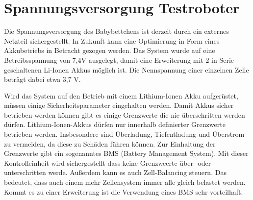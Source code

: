 



\section[Spannungsversorgung Testroboter]{Spannungsversorgung Testroboter\authorkatrin} \label{Spannungsversorgung Optimierung}
Die Spannungsversorgung des Babybettchens ist derzeit durch ein externes Netzteil sichergestellt. In Zukunft kann eine Optimierung in Form eines Akkubetriebs in Betracht gezogen werden.
Das System wurde auf eine Betreibsspannung von 7,4V ausgelegt, damit eine Erweiterung mit 2 in Serie geschaltenen Li-Ionen Akkus möglich ist. Die Nennspannung einer einzelnen Zelle beträgt dabei etwa 3,7 V. 
\par\vspace{1em}
\noindent
Wird das System auf den Betrieb mit einem Lithium-Ionen Akku aufgerüstet, müssen einige Sicherheitsparameter eingehalten werden. Damit Akkus sicher betrieben werden können 
gibt es einige Grenzwerte die nie überschritten werden dürfen. Lithium-Ionen-Akkus dürfen nur innerhalb definierter Grenzwerte betrieben werden. Insbesondere sind Überladung, Tiefentladung und Überstrom zu vermeiden, 
da diese zu Schäden führen können. Zur Einhaltung der Grenzwerte gibt ein sogenanntes BMS (Battery Management System). Mit dieser Kontrolleinheit wird sichergestellt dass keine Grenzweerte über- oder unterschritten werde.
Außerdem kann es auch Zell-Balancing steuern. Das bedeutet, dass auch einem mehr Zellensystem immer alle gleich belastet werden. Kommt es zu einer Erweiterung ist die Verwendung eines BMS sehr vorteilhaft.\cite{battery_management_system_mathworks}\cite{akkushop_spannungen_liion}
\par\vspace{1em}

